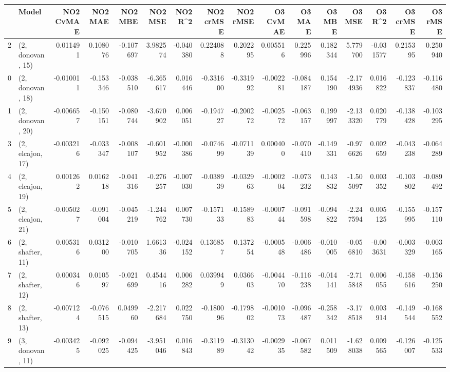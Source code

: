 \begin{tabular}{llrrrrrrrrrrrrrr}
\toprule
{} &             Model &  NO2 CvMAE &   NO2 MAE &   NO2 MBE &    NO2 MSE &   NO2 R\textasciicircum2 &  NO2 crMSE &  NO2 rMSE &  O3 CvMAE &    O3 MAE &    O3 MBE &     O3 MSE &    O3 R\textasciicircum2 &  O3 crMSE &   O3 rMSE \\
\midrule
2  &  (2, donovan, 15) &   0.011491 &  0.108076 & -0.107697 &   3.982574 & -0.040380 &   0.224088 &  0.202295 &  0.005516 &  0.225996 &  0.182344 &   5.779700 & -0.031577 &  0.215395 &  0.250940 \\
0  &  (2, donovan, 18) &  -0.010011 & -0.153346 & -0.038510 &  -6.365617 &  0.016446 &  -0.331600 & -0.331992 & -0.002281 & -0.084187 &  0.154190 &  -2.174936 &  0.016822 & -0.123837 & -0.116480 \\
1  &  (2, donovan, 20) &  -0.006657 & -0.150151 & -0.080744 &  -3.670902 &  0.006051 &  -0.194727 & -0.200272 & -0.002572 & -0.063157 &  0.199997 &  -2.133320 &  0.020779 & -0.138428 & -0.103295 \\
3  &  (2, elcajon, 17) &  -0.003216 & -0.033347 & -0.008107 &  -0.601952 & -0.000386 &  -0.074699 & -0.071139 &  0.000400 & -0.070410 & -0.149331 &  -0.976626 &  0.002659 & -0.043238 & -0.064289 \\
4  &  (2, elcajon, 19) &   0.001262 &  0.016218 & -0.041316 &  -0.276257 & -0.007030 &  -0.038939 & -0.032963 & -0.000204 & -0.073232 &  0.143832 &  -1.505097 &  0.003352 & -0.103802 & -0.089492 \\
5  &  (2, elcajon, 21) &  -0.005027 & -0.091004 & -0.045219 &  -1.244762 &  0.007730 &  -0.157133 & -0.158983 & -0.000744 & -0.091598 & -0.094822 &  -2.247594 &  0.005125 & -0.155995 & -0.157110 \\
6  &  (2, shafter, 11) &   0.005316 &  0.031200 & -0.010705 &   1.661336 & -0.024152 &   0.136857 &  0.137254 & -0.000548 & -0.006486 & -0.010005 &  -0.056810 & -0.003631 & -0.003329 & -0.003165 \\
7  &  (2, shafter, 12) &   0.000346 &  0.010597 & -0.021699 &   0.454416 &  0.006282 &   0.039949 &  0.036603 & -0.004470 & -0.116238 & -0.014141 &  -2.715848 &  0.006055 & -0.158616 & -0.156250 \\
8  &  (2, shafter, 13) &  -0.007124 & -0.076515 &  0.049960 &  -2.217684 &  0.022750 &  -0.180096 & -0.179802 & -0.001073 & -0.096487 & -0.258342 &  -3.178518 &  0.003914 & -0.149544 & -0.168552 \\
9  &  (3, donovan, 11) &  -0.003425 & -0.092025 & -0.094425 &  -3.951046 &  0.016843 &  -0.311989 & -0.313042 & -0.002935 & -0.067582 &  0.011509 &  -1.628038 &  0.009565 & -0.126007 & -0.125533 \\

\end{tabular}
